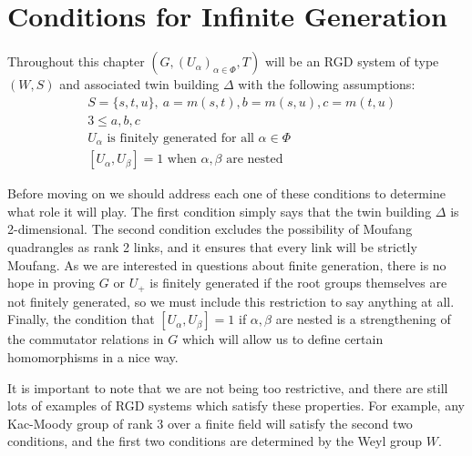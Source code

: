 \documentclass[class=book, crop=false,12 pt]{standalone}
\begin{document}
\chapter{Conditions for Infinite Generation}
\label{ch:general}

Throughout this chapter $(G,(U_\alpha)_{\alpha\in \Phi},T)$ will be an RGD system of type $(W,S)$ and associated twin building $\Delta$ with the following assumptions:
\smallskip
\begin{equation}
	\label{assume}
	\tag{A} 
\begin{aligned}
	&S=\{s,t,u\},\: a=m(s,t),b=m(s,u),c=m(t,u)\\
	&3\le a,b,c\\
	&U_\alpha \text{ is finitely generated for all }\alpha\in \Phi\\
	&[U_\alpha,U_\beta]=1\text{ when }\alpha,\beta \text{ are nested}
\end{aligned}
\end{equation}

Before moving on we should address each one of these conditions to determine what role it will play. The first condition simply says that the twin building $\Delta$ is 2-dimensional. The second condition excludes the possibility of Moufang quadrangles as rank 2 links, and it ensures that every link will be strictly Moufang. As we are interested in questions about finite generation, there is no hope in proving $G$ or $U_+$ is finitely generated if the root groups themselves are not finitely generated, so we must include this restriction to say anything at all. Finally, the condition that $[U_\alpha,U_\beta]=1$ if $\alpha,\beta$ are nested is a strengthening of the commutator relations in $G$ which will allow us to define certain homomorphisms in a nice way.

It is important to note that we are not being too restrictive, and there are still lots of examples of RGD systems which satisfy these properties. For example, any Kac-Moody group of rank 3 over a finite field will satisfy the second two conditions, and the first two conditions are determined by the Weyl group $W.$
\end{document}
